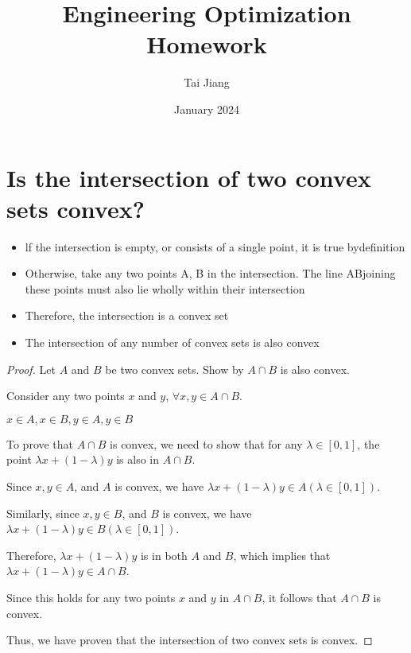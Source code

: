 \documentclass{article}
\title{Engineering Optimization Homework}
\author{Tai Jiang}
\date{January 2024}
\begin{document}
  \maketitle
  \section{Is the intersection of two convex sets convex?}
  \begin{itemize}
    \item lf the intersection is empty, or consists of a single point, it is true bydefinition
    \item Otherwise, take any two points A, B in the intersection. The line ABjoining these points must also lie wholly within their intersection
    \item Therefore, the intersection is a convex set
    \item The intersection of any number of convex sets is also convex
  \end{itemize}

  \begin{proof}
  Let $A$ and $B$ be two convex sets. Show by $A \cap B$ is also convex.

  Consider any two points $x$ and $y$,  $\forall x, y \in A \cap B$.
  
  $x \in A, x \in B, y \in A, y \in B$

  To prove that $A \cap B$ is convex, we need to show that for any $\lambda \in [0,1]$, the point $\lambda x + (1-\lambda)y$ is also in $A \cap B$.

  Since $x,y \in A$, and $A$ is convex, we have $\lambda x + (1-\lambda)y \in A (\lambda \in [0,1])$.

  Similarly, since $x,y \in B$, and $B$ is convex, we have $\lambda x + (1-\lambda)y \in B (\lambda \in [0,1])$.

  Therefore, $\lambda x + (1-\lambda)y$ is in both $A$ and $B$, which implies that $\lambda x + (1-\lambda)y \in A \cap B$.

  Since this holds for any two points $x$ and $y$ in $A \cap B$, it follows that $A \cap B$ is convex.

  Thus, we have proven that the intersection of two convex sets is convex.

  \end{proof}
\end{document}
